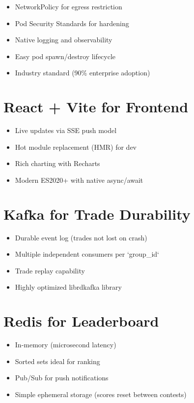 \documentclass[10pt,a4paper,oneside]{report}
\begin{document}
\begin{itemize}
    \item NetworkPolicy for egress restriction
    \item Pod Security Standards for hardening
    \item Native logging and observability
    \item Easy pod spawn/destroy lifecycle
    \item Industry standard (90\% enterprise adoption)
\end{itemize}

\section{React + Vite for Frontend}

\begin{itemize}
    \item Live updates via SSE push model
    \item Hot module replacement (HMR) for dev
    \item Rich charting with Recharts
    \item Modern ES2020+ with native async/await
\end{itemize}

\section{Kafka for Trade Durability}

\begin{itemize}
    \item Durable event log (trades not lost on crash)
    \item Multiple independent consumers per `group_id`
    \item Trade replay capability
    \item Highly optimized librdkafka library
\end{itemize}

\section{Redis for Leaderboard}

\begin{itemize}
    \item In-memory (microsecond latency)
    \item Sorted sets ideal for ranking
    \item Pub/Sub for push notifications
    \item Simple ephemeral storage (scores reset between contests)
\end{itemize}
\end{document}
